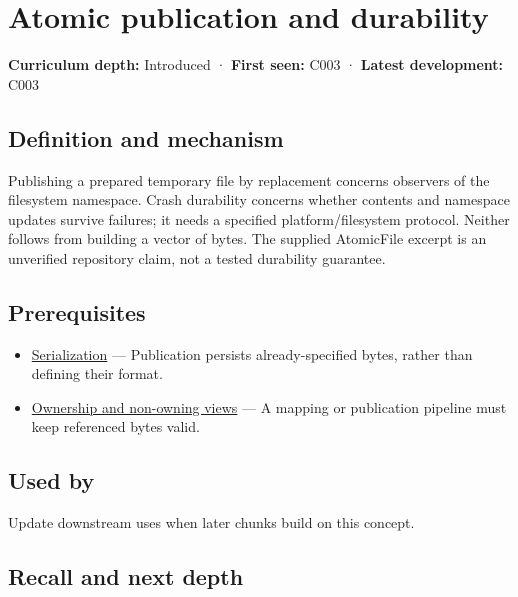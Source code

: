 \hypertarget{appendix-e89a8f290ef5}{}\label{referencestart:appendix-e89a8f290ef5}
\section{Atomic publication and durability}\label{appendix-e89a8f290ef5-atomic-publication-and-durability}

\textbf{Curriculum depth:} Introduced · \textbf{First seen:} C003 · \textbf{Latest development:} C003

\subsection{Definition and mechanism}\label{appendix-e89a8f290ef5-definition-and-mechanism}

Publishing a prepared temporary file by replacement concerns observers of the filesystem namespace. Crash durability concerns whether contents and namespace updates survive failures; it needs a specified platform/filesystem protocol. Neither follows from building a vector of bytes. The supplied AtomicFile excerpt is an unverified repository claim, not a tested durability guarantee.

\subsection{Prerequisites}\label{appendix-e89a8f290ef5-prerequisites}

\begin{itemize}
\tightlist
\item
  \hyperref[appendix-91d09ebed979]{Serialization} --- Publication persists already-specified bytes, rather than defining their format.
\item
  \hyperref[appendix-d52e4486f527]{Ownership and non-owning views} --- A mapping or publication pipeline must keep referenced bytes valid.
\end{itemize}

\subsection{Used by}\label{appendix-e89a8f290ef5-used-by}

Update downstream uses when later chunks build on this concept.

\subsection{Recall and next depth}\label{appendix-e89a8f290ef5-recall-and-next-depth}

